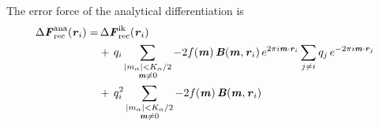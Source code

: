 \documentclass[aps,pre,preprint,unsortedaddress]{revtex4}
\renewcommand{\v}[1]{\textbf{\textit{#1}}}
\begin{document}
The error force of the analytical differentiation is 
\begin{align}\nonumber
  \Delta\v F_{\textrm{rec}}^{\textrm{ana}}(\v r_i)
  =&\,
  \Delta\v F_{\textrm{rec}}^{\textrm{ik}}(\v r_i)\\\nonumber
  & +\,
  q_i
  \sum_{
    \begin{subarray}{c}
      \vert m_{\alpha}\vert < K_\alpha/2\\
      \v m\neq 0
    \end{subarray}}
  -2f(\v m)\,
  \v B(\v m, \v r_i)\,e^{2\pi i\v m\cdot \v r_i}
  \sum_{j\neq i}q_j\,
  e^{-2\pi i\v m\cdot\v r_j} \\\label{eqn:ana.error.force}
  & +\,
  q^2_i
  \sum_{
    \begin{subarray}{c}
      \vert m_{\alpha}\vert < K_\alpha/2\\
      \v m\neq 0
    \end{subarray}}
  -2f(\v m)\,\v B(\v m, \v r_i) 
\end{align}
\end{document}
